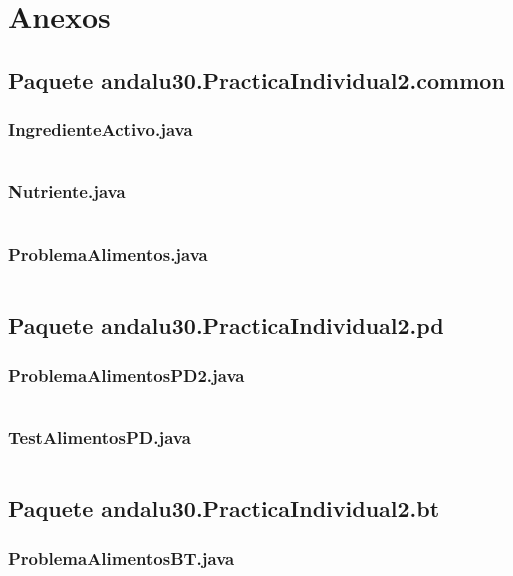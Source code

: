 \documentclass[a4paper,12pt]{article}
\begin{document}
\section{Anexos}
\subsection{Paquete andalu30.PracticaIndividual2.common}
\subsubsection{IngredienteActivo.java}
\inputminted[fontsize=\footnotesize,breaklines]{java}{src/andalu30/PracticaIndividual2/common/IngredienteActivo.java}
\subsubsection{Nutriente.java}
\inputminted[fontsize=\footnotesize,breaklines]{java}{src/andalu30/PracticaIndividual2/common/Nutriente.java}
\subsubsection{ProblemaAlimentos.java}
\inputminted[fontsize=\footnotesize,breaklines]{java}{src/andalu30/PracticaIndividual2/common/ProblemaAlimentos.java}

\subsection{Paquete andalu30.PracticaIndividual2.pd}
\subsubsection{ProblemaAlimentosPD2.java}
\inputminted[fontsize=\footnotesize,breaklines]{java}{src/andalu30/PracticaIndividual2/pd/ProblemaAlimentosPD2.java}
\subsubsection{TestAlimentosPD.java}
\inputminted[fontsize=\footnotesize,breaklines]{java}{src/andalu30/PracticaIndividual2/pd/TestAlimentosPD.java}



\subsection{Paquete andalu30.PracticaIndividual2.bt}
\subsubsection{ProblemaAlimentosBT.java}
\inputminted[fontsize=\footnotesize,breaklines]{java}{src/andalu30/PracticaIndividual2/bt/ProblemaAlimentosBT.java}
\end{document}
